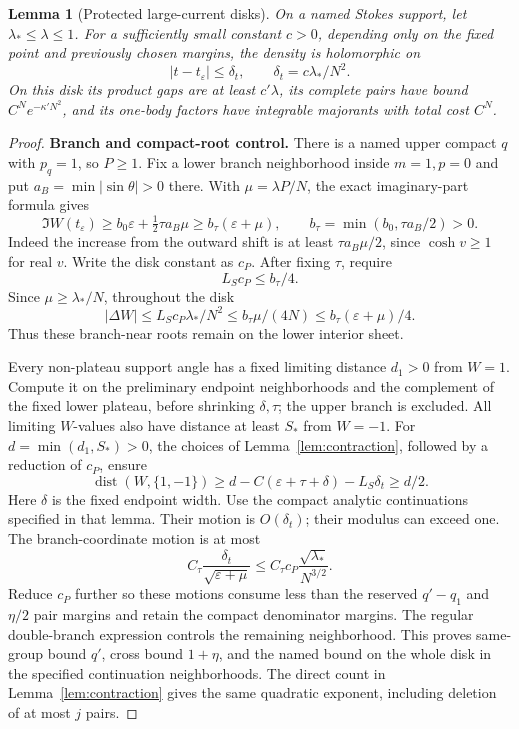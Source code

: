 \documentclass[11pt]{article}
\numberwithin{equation}{section}
\newtheorem{lemma}[theorem]{Lemma}
\theoremstyle{definition}
\newcommand{\eps}{\varepsilon}
\begin{document}
\begin{lemma}[Protected large-current disks]\label{lem:protected}
On a named Stokes support, let \(\lambda_*\le\lambda\le1\).
For a sufficiently small constant \(c>0\), depending only on
the fixed point and previously chosen margins, the density is
holomorphic on
\[
 |t-t_\eps|\le\delta_t,\qquad \delta_t=c\lambda_*/N^2 .
\]
On this disk its product gaps are at least \(c'\lambda\),
its complete pairs have bound \(C^Ne^{-\kappa' N^2}\), and its
one-body factors have integrable majorants with total cost \(C^N\).
\end{lemma}
\begin{proof}
\noindent\textbf{Branch and compact-root control.} There is a named upper compact \(q\) with \(p_q=1\), so
\(P\ge1\). Fix a lower branch neighborhood inside \(m=1,p=0\)
and put \(a_B=\min|\sin\theta|>0\) there. With
\(\mu=\lambda P/N\), the exact imaginary-part formula gives
\[
 \Im W(t_\eps)\ge b_0\eps+\tfrac12\tau a_B\mu
 \ge b_\tau(\eps+\mu),\qquad
 b_\tau=\min(b_0,\tau a_B/2)>0.
\]
Indeed the increase from the outward shift is at least
\(\tau a_B\mu/2\), since \(\cosh v\ge1\) for real \(v\).
Write the disk constant as \(c_P\). After fixing \(\tau\), require
\[
 L_Sc_P\le b_\tau/4.
\]
Since \(\mu\ge\lambda_*/N\), throughout the disk
\[
 |\Delta W|\le L_Sc_P\lambda_*/N^2
 \le b_\tau \mu/(4N)\le b_\tau(\eps+\mu)/4.
\]
Thus these branch-near roots remain on the lower interior sheet.

Every non-plateau support angle has a fixed limiting distance
\(d_1>0\) from \(W=1\). Compute it on the preliminary endpoint
neighborhoods and the complement of the fixed lower plateau,
before shrinking \(\delta,\tau\); the upper branch is excluded.
All limiting \(W\)-values also have distance at least \(S_*\) from \(W=-1\).
For \(d=\min(d_1,S_*)>0\), the choices of
Lemma~\ref{lem:contraction}, followed by a reduction of \(c_P\),
ensure
\[
 \operatorname{dist}(W,\{1,-1\})
 \ge d-C(\eps+\tau+\delta)-L_S\delta_t\ge d/2.
\]
Here \(\delta\) is the fixed endpoint width.
Use the compact analytic continuations specified in that lemma.
Their motion is \(O(\delta_t)\); their modulus can exceed one.
The branch-coordinate motion is at most
\[
 C_\tau\frac{\delta_t}{\sqrt{\eps+\mu}}
 \le C_\tau c_P\frac{\sqrt{\lambda_*}}{N^{3/2}}.
\]
Reduce \(c_P\) further so these motions consume less than
the reserved \(q'-q_1\) and \(\eta/2\) pair margins and retain
the compact denominator margins. The regular double-branch
expression controls the remaining neighborhood. This proves
same-group bound \(q'\), cross bound \(1+\eta\), and the named
bound on the whole disk in the specified continuation neighborhoods.
The direct count in Lemma~\ref{lem:contraction} gives the same
quadratic exponent, including deletion of at most \(j\) pairs.


\end{proof}
\end{document}
